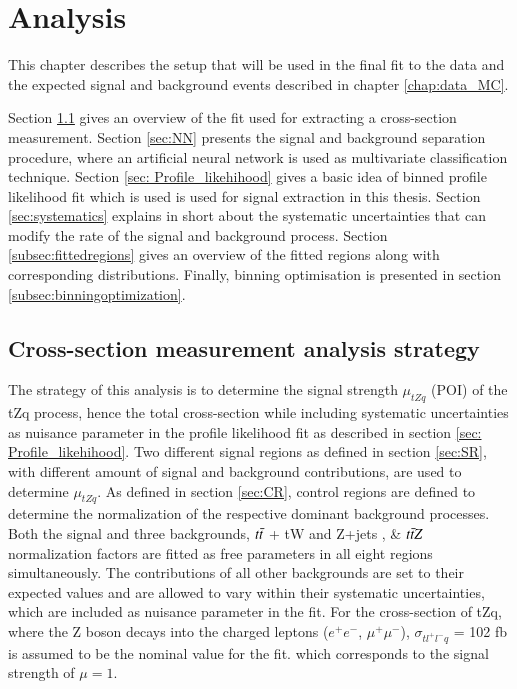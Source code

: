 
\chapter{Analysis}
\label{chap:multivariate_analysis}

This chapter describes the setup that will be used in the final fit to the data and the expected signal and background events described in chapter \ref{chap:data_MC}. 

Section \ref{sec:strategy} gives an overview of the fit used for extracting a cross-section measurement. Section \ref{sec:NN} presents the signal and background separation procedure, where an artificial neural network is used as multivariate classification technique.  Section \ref{sec: Profile_likehihood} gives a basic idea of binned profile likelihood fit which is used is used for signal extraction in this thesis. Section \ref{sec:systematics} explains in short about the systematic uncertainties that can modify the rate of the signal and background process. Section \ref{subsec:fittedregions} gives an overview of the fitted regions along with corresponding distributions. Finally, binning optimisation is presented in section \ref{subsec:binningoptimization}. 

\section{Cross-section measurement analysis strategy}
\label{sec:strategy}

The strategy of this analysis is to determine the signal strength $\mu_{tZq}$ (POI) of the tZq process, hence the total cross-section while including systematic uncertainties as nuisance parameter in the profile likelihood fit as described in section \ref{sec: Profile_likehihood}. Two different signal regions as defined in section \ref{sec:SR}, with different amount of signal and background contributions, are used to determine $\mu_{tZq}$. As defined in section \ref{sec:CR}, control regions are defined  to determine the normalization of the respective dominant background processes. Both the signal and three backgrounds, $t\Bar{t}$ + tW and Z+jets , \& $t\Bar{t}Z$ normalization factors are fitted as free parameters in all eight regions simultaneously. The contributions of all other backgrounds are set to their expected values and are allowed to vary within their systematic uncertainties, which are included as nuisance parameter in the fit. For the cross-section of tZq, where the Z boson decays into the charged leptons ($e^{+}e^{-}$, $\mu^{+}\mu^{-}$), $\sigma_{tl^{+}l^{-}q}$ = 102 fb is assumed to be the nominal value \cite{tZq2020} for the fit. which corresponds to the signal strength of $\mu = 1$.


